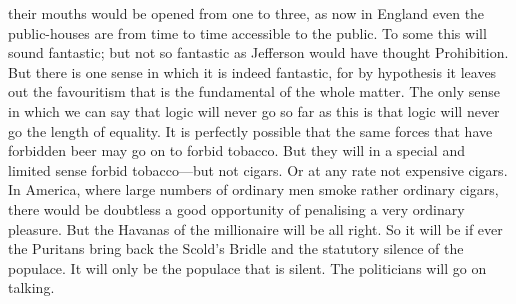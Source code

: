 \documentclass{book}
\begin{document}
their mouths would be opened from one to three, as now in England even the public-houses are from time to time accessible to the public. To some this will sound fantastic; but not so fantastic as Jefferson would have thought Prohibition. But there is one sense in which it is indeed fantastic, for by hypothesis it leaves out the favouritism that is the fundamental of the whole matter. The only sense in which we can say that logic will never go so far as this is that logic will never go the length of equality. It is perfectly possible that the same forces that have forbidden beer may go on to forbid tobacco. But they will in a special and limited sense forbid tobacco—but not cigars. Or at any rate not expensive cigars. In America, where large numbers of ordinary men smoke rather ordinary cigars, there would be doubtless a good opportunity of penalising a very ordinary pleasure. But the Havanas of the millionaire will be all right. So it will be if ever the Puritans bring back the Scold’s Bridle and the statutory silence of the populace. It will only be the populace that is silent. The politicians will go on talking.
\end{document}
